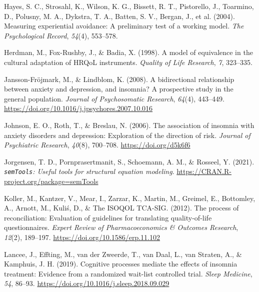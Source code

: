 \documentclass[
  ,doc,11pt, twoside,floatsintext]{apa6}
\newlength{\cslhangindent}
\newlength{\cslentryspacingunit} %
\newenvironment{CSLReferences}[2] %
 {%
  \setlength{\parindent}{0pt}
  \ifodd #1
  \let\oldpar\par
  \def\par{\hangindent=\cslhangindent\oldpar}
  \fi
  \setlength{\parskip}{#2\cslentryspacingunit}
 }%
 {}
\begin{document}
\begin{CSLReferences}{1}{0}
\leavevmode{}%
Hayes, S. C., Strosahl, K., Wilson, K. G., Bissett, R. T., Pistorello, J., Toarmino, D., Polusny, M. A., Dykstra, T. A., Batten, S. V., Bergan, J., et al. (2004). Measuring experiential avoidance: A preliminary test of a working model. \emph{The Psychological Record}, \emph{54}(4), 553--578.

\leavevmode{}%
Herdman, M., Fox-Rushby, J., \& Badia, X. (1998). A model of equivalence in the cultural adaptation of {HRQoL} instruments. \emph{Quality of Life Research}, \emph{7}, 323--335.

\leavevmode{}%
Jansson-Fröjmark, M., \& Lindblom, K. (2008). A bidirectional relationship between anxiety and depression, and insomnia? {A} prospective study in the general population. \emph{Journal of Psychosomatic Research}, \emph{64}(4), 443--449. \url{https://doi.org/10.1016/j.jpsychores.2007.10.016}

\leavevmode{}%
Johnson, E. O., Roth, T., \& Breslau, N. (2006). The association of insomnia with anxiety disorders and depression: Exploration of the direction of risk. \emph{Journal of Psychiatric Research}, \emph{40}(8), 700--708. \url{https://doi.org/d5k6f6}

\leavevmode{}%
Jorgensen, T. D., Pornprasertmanit, S., Schoemann, A. M., \& Rosseel, Y. (2021). \emph{\texttt{semTools}: {U}seful tools for structural equation modeling}. \url{https://CRAN.R-project.org/package=semTools}

\leavevmode{}%
Koller, M., Kantzer, V., Mear, I., Zarzar, K., Martin, M., Greimel, E., Bottomley, A., Arnott, M., Kuliś, D., \& The ISOQOL TCA-SIG. (2012). The process of reconciliation: Evaluation of guidelines for translating quality-of-life questionnaires. \emph{Expert Review of Pharmacoeconomics \& Outcomes Research}, \emph{12}(2), 189--197. \url{https://doi.org/10.1586/erp.11.102}

\leavevmode{}%
Lancee, J., Effting, M., van der Zweerde, T., van Daal, L., van Straten, A., \& Kamphuis, J. H. (2019). Cognitive processes mediate the effects of insomnia treatment: Evidence from a randomized wait-list controlled trial. \emph{Sleep Medicine}, \emph{54}, 86--93. \url{https://doi.org/10.1016/j.sleep.2018.09.029}


\end{CSLReferences}
\end{document}
